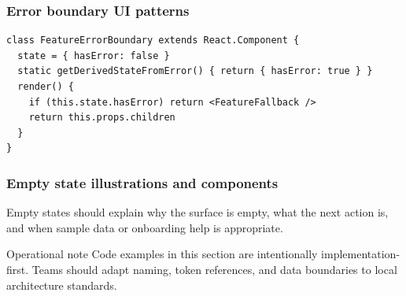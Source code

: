 \subsubsection{Error boundary UI patterns}
\begin{verbatim}
class FeatureErrorBoundary extends React.Component {
  state = { hasError: false }
  static getDerivedStateFromError() { return { hasError: true } }
  render() {
    if (this.state.hasError) return <FeatureFallback />
    return this.props.children
  }
}
\end{verbatim}

\subsubsection{Empty state illustrations and components}
Empty states should explain why the surface is empty, what the next action is, and when sample data or onboarding help is appropriate.

\begin{highlightbox}{Operational note}
Code examples in this section are intentionally implementation-first. Teams should adapt naming, token references, and data boundaries to local architecture standards.
\end{highlightbox}
